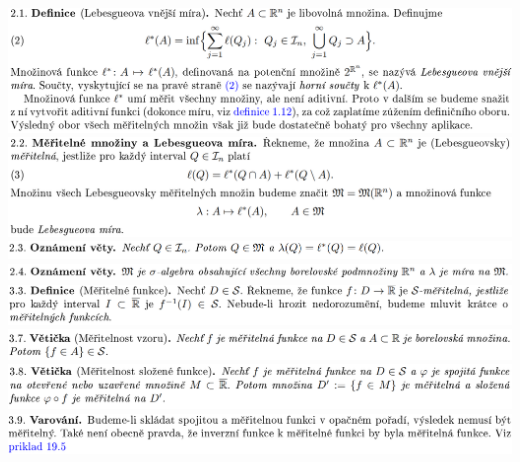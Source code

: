 \documentclass[12pt,a4paper]{article}
\begin{document}
\begin{center}
		\includegraphics[width=\textwidth]{img/1lebInt/2020-06-20 17 51 15.png}\vspace{0.3cm}
		\includegraphics[width=\textwidth]{img/1lebInt/2020-06-20 17 51 30.png}\vspace{0.3cm}
		\includegraphics[width=\textwidth]{img/1lebInt/2020-06-20 17 51 40.png}\vspace{0.3cm}
		\includegraphics[width=\textwidth]{img/1lebInt/2020-06-20 17 51 46.png}\vspace{0.3cm}
		\includegraphics[width=\textwidth]{img/1lebInt/2020-06-20 17 52 02.png}\vspace{0.3cm}
		\includegraphics[width=\textwidth]{img/1lebInt/2020-06-20 17 52 51.png}\vspace{0.3cm}
		\includegraphics[width=\textwidth]{img/1lebInt/2020-06-20 17 52 57.png}\vspace{0.3cm}
		\includegraphics[width=\textwidth]{img/1lebInt/2020-06-20 17 53 08.png}\vspace{0.3cm}

\end{center}
\end{document}

